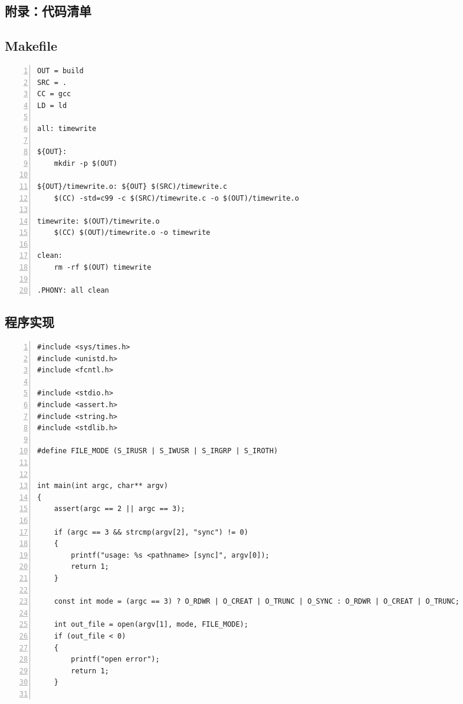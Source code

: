\documentclass[a4paper,twoside]{article}
\begin{document}
\begin{spacing}{1.2}



\clearpage
\section*{附录：代码清单}
\label{sec:code}

\subsection{Makefile}


\begin{lstlisting}[numbers=left,style=MakefileStyle,caption=Makefile,label={code:makefile}]
OUT = build
SRC = .
CC = gcc
LD = ld

all: timewrite

${OUT}: 
	mkdir -p $(OUT)

${OUT}/timewrite.o: ${OUT} $(SRC)/timewrite.c
	$(CC) -std=c99 -c $(SRC)/timewrite.c -o $(OUT)/timewrite.o

timewrite: $(OUT)/timewrite.o
	$(CC) $(OUT)/timewrite.o -o timewrite

clean: 
	rm -rf $(OUT) timewrite

.PHONY: all clean	
\end{lstlisting}


\subsection{程序实现}

\begin{lstlisting}[numbers=left,style=CppStyle,caption=程序实现,label={code:impl}]
#include <sys/times.h>
#include <unistd.h>
#include <fcntl.h>

#include <stdio.h>
#include <assert.h>
#include <string.h>
#include <stdlib.h>

#define FILE_MODE (S_IRUSR | S_IWUSR | S_IRGRP | S_IROTH)


int main(int argc, char** argv)
{
    assert(argc == 2 || argc == 3);

    if (argc == 3 && strcmp(argv[2], "sync") != 0)
    {
        printf("usage: %s <pathname> [sync]", argv[0]);
        return 1;
    }

    const int mode = (argc == 3) ? O_RDWR | O_CREAT | O_TRUNC | O_SYNC : O_RDWR | O_CREAT | O_TRUNC;

    int out_file = open(argv[1], mode, FILE_MODE);
    if (out_file < 0)
    {
        printf("open error");
        return 1;
    }


\end{lstlisting}
\end{spacing}
\end{document}
